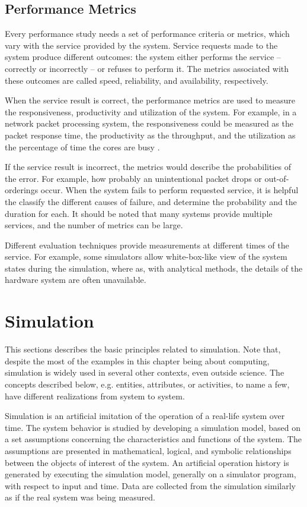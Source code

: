 \subsection{Performance Metrics}
Every performance study needs a set of performance criteria or metrics, which vary with the service provided by the system. Service requests made to the system produce different outcomes: the system either performs the service -- correctly or incorrectly -- or refuses to perform it. The metrics associated with these outcomes are called speed, reliability, and availability, respectively. \cite{jain:1991:AOCSPA}

When the service result is correct, the performance metrics are used to measure the responsiveness, productivity and utilization of the system. For example, in a network packet processing system, the responsiveness could be measured as the packet response time, the productivity as the throughput, and the utilization as the percentage of time the cores are busy \cite{Cavium FUNDAMENTALS}. \cite{jain:1991:AOCSPA}

If the service result is incorrect, the metrics would describe the probabilities of the error. For example, how probably an unintentional packet drops or out-of-orderings occur. When the system fails to perform requested service, it is helpful the classify the different causes of failure, and determine the probability and the duration for each. It should be noted that many systems provide multiple services, and the number of metrics can be large. \cite{jain:1991:AOCSPA}

Different evaluation techniques provide measurements at different times of the service. For example, some simulators allow white-box-like view of the system states during the simulation, where as, with analytical methods, the details of the hardware system are often unavailable. \cite{jain:1991:AOCSPA}

\section{Simulation}
This sections describes the basic principles related to simulation. Note that, despite the most of the examples in this chapter being about computing, simulation is widely used in several other contexts, even outside science. The concepts described below, e.g. entities, attributes, or activities, to name a few, have different realizations from system to system.

Simulation is an artificial imitation of the operation of a real-life system over time. The system behavior is studied by developing a simulation model, based on a set assumptions concerning the characteristics and functions of the system. The assumptions are presented in mathematical, logical, and symbolic relationships between the objects of interest of the system. An artificial operation history is generated by executing the simulation model, generally on a simulator program, with respect to input and time. Data are collected from the simulation similarly as if the real system was being measured.

